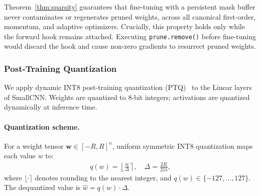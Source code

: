 \begin{remark}
Theorem~\ref{thm:sparsity} guarantees that fine-tuning with a persistent mask buffer never contaminates or regenerates pruned weights, across all canonical first-order, momentum, and adaptive optimizers.
Crucially, this property holds only while the forward hook remains attached.
Executing \texttt{prune.remove()} before fine-tuning would discard the hook and cause non-zero gradients to resurrect pruned weights.
\end{remark}

\subsubsection{Post-Training Quantization}
\label{sec:quantization}

We apply dynamic INT8 post-training quantization
(PTQ)~\citep{jacob2018quantization} to the Linear layers of SmallCNN.
Weights are quantized to 8-bit integers; activations are quantized
dynamically at inference time.

\paragraph{Quantization scheme.}
For a weight tensor $\mathbf{w} \in [-R, R]^n$, uniform symmetric INT8
quantization maps each value $w$ to:
\begin{align}
  q(w) = \left\lfloor \frac{w}{\Delta} \right\rceil, \quad \Delta = \frac{2R}{255},
  \label{eq:quant_scheme}
\end{align}
where $\lfloor \cdot \rceil$ denotes rounding to the nearest integer,
and $q(w) \in \{-127, \ldots, 127\}$.
The dequantized value is $\hat{w} = q(w) \cdot \Delta$.

